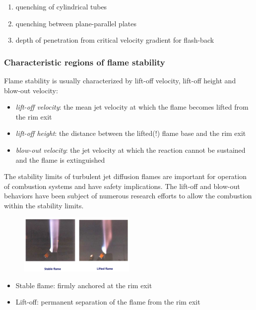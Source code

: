 \documentclass[12pt]{article}
\begin{document}
\begin{enumerate}
    \item quenching of cylindrical tubes
    \item quenching between plane-parallel plates
    \item depth of penetration from critical velocity gradient for flash-back
\end{enumerate}

\subsubsection{Characteristic regions of flame stability}

Flame stability is usually characterized by lift-off velocity, lift-off height and blow-out velocity:

\begin{itemize}
    \item \textit{lift-off velocity}: the mean jet velocity at which the flame becomes lifted from the rim exit
    \item \textit{lift-off height}: the distance between the lifted(!) flame base and the rim exit
    \item \textit{blow-out velocity}: the jet velocity at which the reaction cannot be sustained and the flame is extinguished
\end{itemize}

The stability limits of turbulent jet diffusion flames are important for operation of combustion systems and have safety implications. The lift-off and blow-out behaviors have been subject of numerous research efforts to allow the combustion within the stability limits.

\begin{figure}[h!]
\centering
\includegraphics[width=0.5\textwidth]{figures/stableflame.png}
\end{figure}

\begin{itemize}
    \item Stable flame: firmly anchored at the rim exit
    \item Lift-off: permanent separation of the flame from the rim exit
\end{itemize}
\end{document}
